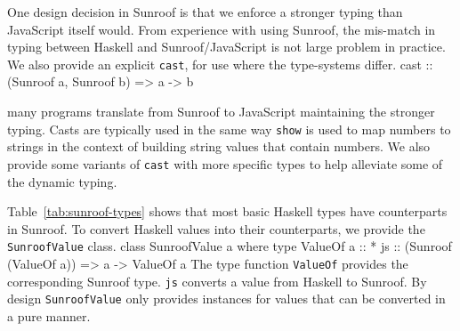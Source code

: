 \documentclass{llncs}
\newcommand{\Src}[1]{{\tt{#1}}}
\newenvironment{Code}{\verbatim}{\endverbatim}
\newcommand{\TabRef}[1]{Table~\ref{#1}}
\begin{document}
One design decision in Sunroof is that we enforce a stronger typing than JavaScript itself would.
From experience with using Sunroof,
the mis-match in typing between Haskell and Sunroof/JavaScript
is not large problem in practice.
We also provide an explicit \Src{cast},
for use where the type-systems differ.
\begin{Code}
cast :: (Sunroof a, Sunroof b) => a -> b
\end{Code}



many programs translate from Sunroof to JavaScript
maintaining the stronger typing.
Casts are typically used in the same way \Src{show} is used
to map numbers to strings in the context of building
string values that contain numbers. We also provide
some variants of \Src{cast} with more specific types
to help alleviate some of the dynamic typing.

\TabRef{tab:sunroof-types} shows that most basic 
Haskell types have counterparts in
Sunroof. To convert Haskell values into their 
counterparts, we provide the \Src{SunroofValue} class.
\begin{Code}
class SunroofValue a where
  type ValueOf a :: *
  js :: (Sunroof (ValueOf a)) => a -> ValueOf a
\end{Code}
The type function
\Src{ValueOf} \cite{Chakravarty:05:AssociatedTypeSynonyms} 
provides the corresponding Sunroof type.
\Src{js} converts a value from Haskell to Sunroof. 
By design \Src{SunroofValue} 
only provides instances for values that can be converted in a pure
manner. 






\end{document}

